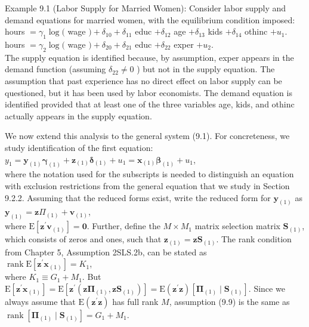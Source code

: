 \documentclass[10pt]{article}
\begin{document}
Example 9.1 (Labor Supply for Married Women): Consider labor supply and demand equations for married women, with the equilibrium condition imposed:\\
hours $=\gamma_{1} \log ($ wage $)+\delta_{10}+\delta_{11}$ educ $+\delta_{12}$ age $+\delta_{13}$ kids $+\delta_{14}$ othinc $+u_{1}$.\\
hours $=\gamma_{2} \log ($ wage $)+\delta_{20}+\delta_{21}$ educ $+\delta_{22}$ exper $+u_{2}$.\\
The supply equation is identified because, by assumption, exper appears in the demand function (assuming $\delta_{22} \neq 0$ ) but not in the supply equation. The assumption that past experience has no direct effect on labor supply can be questioned, but it has been used by labor economists. The demand equation is identified provided that at least one of the three variables age, kids, and othinc actually appears in the supply equation.

We now extend this analysis to the general system (9.1). For concreteness, we study identification of the first equation:\\
$y_{1}=\mathbf{y}_{(1)} \boldsymbol{\gamma}_{(1)}+\mathbf{z}_{(1)} \boldsymbol{\delta}_{(1)}+u_{1}=\mathbf{x}_{(1)} \boldsymbol{\beta}_{(1)}+u_{1}$,\\
where the notation used for the subscripts is needed to distinguish an equation with exclusion restrictions from the general equation that we study in Section 9.2.2. Assuming that the reduced forms exist, write the reduced form for $\mathbf{y}_{(1)}$ as\\
$\mathbf{y}_{(1)}=\mathbf{z} \Pi_{(1)}+\mathbf{v}_{(1)}$,\\
where $\mathrm{E}\left[\mathbf{z}^{\prime} \mathbf{v}_{(1)}\right]=\mathbf{0}$. Further, define the $M \times M_{1}$ matrix selection matrix $\mathbf{S}_{(1)}$, which consists of zeros and ones, such that $\mathbf{z}_{(1)}=\mathbf{z} \mathbf{S}_{(1)}$. The rank condition from Chapter 5, Assumption 2SLS.2b, can be stated as\\
$\operatorname{rank} \mathrm{E}\left[\mathbf{z}^{\prime} \mathbf{x}_{(1)}\right]=K_{1}$,\\
where $K_{1} \equiv G_{1}+M_{1}$. But $\mathrm{E}\left[\mathbf{z}^{\prime} \mathbf{x}_{(1)}\right]=\mathrm{E}\left[\mathbf{z}^{\prime}\left(\mathbf{z} \boldsymbol{\Pi}_{(1)}, \mathbf{z} \mathbf{S}_{(1)}\right)\right]=\mathrm{E}\left(\mathbf{z}^{\prime} \mathbf{z}\right)\left[\boldsymbol{\Pi}_{(1)} \mid \mathbf{S}_{(1)}\right]$. Since we always assume that $\mathrm{E}\left(\mathbf{z}^{\prime} \mathbf{z}\right)$ has full rank $M$, assumption (9.9) is the same as\\
$\operatorname{rank}\left[\boldsymbol{\Pi}_{(1)} \mid \mathbf{S}_{(1)}\right]=G_{1}+M_{1}$.
\end{document}
